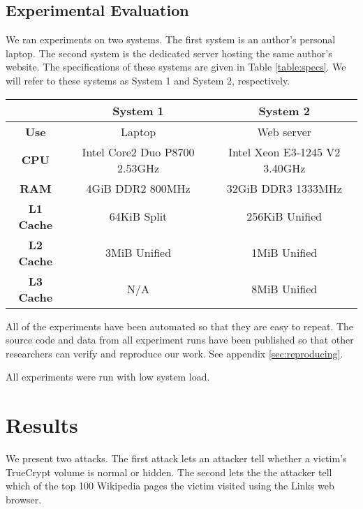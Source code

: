 \documentclass{acm_proc_article-sp}
\begin{document}
\subsection{Experimental Evaluation}

We ran experiments on two systems. The first system is an author's personal
laptop. The second system is the dedicated server hosting the same author's
website. The specifications of these systems are given in Table
\ref{table:specs}. We will refer to these systems as System 1 and System 2,
respectively.

\begin{table*}
    \centering
\begin{tabular}{|c|c|c|}
    \hline
    & \textbf{System 1} & \textbf{System 2} \\
    \hline
    \textbf{Use} & Laptop & Web server \\
    \hline
    \textbf{CPU} & Intel Core2 Duo P8700 2.53GHz & Intel Xeon E3-1245 V2 3.40GHz  \\
    \hline
    \textbf{RAM} & 4GiB DDR2 800MHz & 32GiB DDR3 1333MHz \\
    \hline
    \textbf{L1 Cache} & 64KiB Split & 256KiB Unified \\
    \hline
    \textbf{L2 Cache} & 3MiB Unified & 1MiB Unified \\
    \hline
    \textbf{L3 Cache} & N/A & 8MiB Unified \\
    \hline
\end{tabular}
\caption{System Specifications. Cache specifications were obtained by the
\texttt{dmidecode} utility and may not be accurate.}
\label{table:specs}
\end{table*}

All of the experiments have been automated so that they are easy to repeat. The
source code and data from all experiment runs have been published so that other
researchers can verify and reproduce our work. See appendix
\ref{sec:reproducing}.

All experiments were run with low system load.

\section{Results}
\label{sec:results}

We present two attacks. The first attack lets an attacker tell whether
a victim's TrueCrypt volume is normal or hidden. The second lets the the
attacker tell which of the top 100 Wikipedia pages the victim visited using the
Links web browser.
\end{document}
